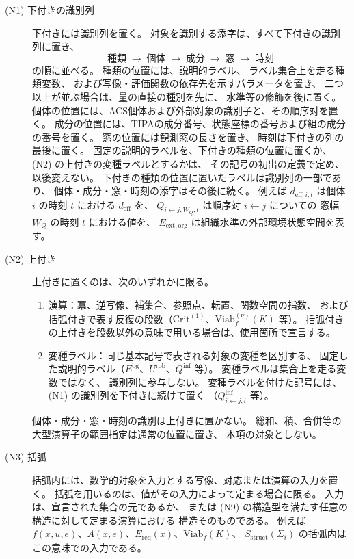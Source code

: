 \begin{description}

  \item[(N1) 下付きの識別列]
    下付きには識別列を置く。
    対象を識別する添字は、すべて下付きの識別列に置き、
    \[
      \text{種類}\;\to\;\text{個体}\;\to\;\text{成分}\;\to\;\text{窓}\;\to\;\text{時刻}
    \]
    の順に並べる。
    種類の位置には、説明的ラベル、
    ラベル集合上を走る種類変数、
    および写像・評価関数の依存先を示すパラメータを置き、
    二つ以上が並ぶ場合は、量の直接の種別を先に、
    水準等の修飾を後に置く。
    個体の位置には、ACS個体および外部対象の識別子と、その順序対を置く。
    成分の位置には、TIPAの成分番号、状態座標の番号および組の成分の番号を置く。
    窓の位置には観測窓の長さを置き、
    時刻は下付きの列の最後に置く。
    固定の説明的ラベルを、下付きの種類の位置に置くか、
    (N2) の上付きの変種ラベルとするかは、
    その記号の初出の定義で定め、以後変えない。
    下付きの種類の位置に置いたラベルは識別列の一部であり、
    個体・成分・窓・時刻の添字はその後に続く。
    例えば $d_{\mathrm{eff},i,t}$ は個体 $i$ の時刻 $t$ における
    $d_{\mathrm{eff}}$ を、
    $\bar Q_{i\leftarrow j,W_Q,t}$ は順序対 $i\leftarrow j$ についての
    窓幅 $W_Q$ の時刻 $t$ における値を、
    $E_{\mathrm{ext},\mathrm{org}}$ は組織水準の外部環境状態空間を表す。

  \item[(N2) 上付き]
    上付きに置くのは、次のいずれかに限る。
    \begin{enumerate}[label=(\alph*)]
      \item 演算：冪、逆写像、補集合、参照点、転置、関数空間の指数、
      および括弧付きで表す反復の段数（$\mathrm{Crit}^{(1)}$、$\mathrm{Viab}_f^{(\nu)}(K)$ 等）。
      括弧付きの上付きを段数以外の意味で用いる場合は、使用箇所で宣言する。
      \item 変種ラベル：同じ基本記号で表される対象の変種を区別する、
      固定した説明的ラベル（$E^{\mathrm{bg}}$、$U^{\mathrm{rob}}$、$Q^{\mathrm{inf}}$ 等）。
      変種ラベルは集合上を走る変数ではなく、
      識別列に参与しない。
      変種ラベルを付けた記号には、(N1) の識別列を下付きに続けて置く
      （$Q^{\mathrm{inf}}_{i\leftarrow j,t}$ 等）。
    \end{enumerate}
    個体・成分・窓・時刻の識別は上付きに置かない。
    総和、積、合併等の大型演算子の範囲指定は通常の位置に置き、
    本項の対象としない。

  \item[(N3) 括弧]
    括弧内には、数学的対象を入力とする写像、対応または演算の入力を置く。
    括弧を用いるのは、値がその入力によって定まる場合に限る。
    入力は、宣言された集合の元であるか、
    または (N9) の構造型を満たす任意の構造に対して定まる演算における
    構造そのものである。
    例えば $f(x,u,e)$、$A(x,e)$、$E_{\mathrm{req}}(x)$、$\mathrm{Viab}_f(K)$、
    $S_{\mathrm{struct}}(\Sigma_i)$ の括弧内はこの意味での入力である。


\end{description}
